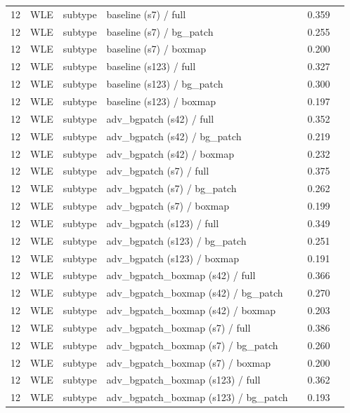 \begin{longtable}{cL{1.1cm}L{1.5cm}L{5.6cm}ccc}
12 & WLE & subtype & baseline (s7) / full & \nl{} & 0.359 & \nl{} \\
12 & WLE & subtype & baseline (s7) / bg\_patch & \nl{} & 0.255 & \nl{} \\
12 & WLE & subtype & baseline (s7) / boxmap & \nl{} & 0.200 & \nl{} \\
12 & WLE & subtype & baseline (s123) / full & \nl{} & 0.327 & \nl{} \\
12 & WLE & subtype & baseline (s123) / bg\_patch & \nl{} & 0.300 & \nl{} \\
12 & WLE & subtype & baseline (s123) / boxmap & \nl{} & 0.197 & \nl{} \\
12 & WLE & subtype & adv\_bgpatch (s42) / full & \nl{} & 0.352 & \nl{} \\
12 & WLE & subtype & adv\_bgpatch (s42) / bg\_patch & \nl{} & 0.219 & \nl{} \\
12 & WLE & subtype & adv\_bgpatch (s42) / boxmap & \nl{} & 0.232 & \nl{} \\
12 & WLE & subtype & adv\_bgpatch (s7) / full & \nl{} & 0.375 & \nl{} \\
12 & WLE & subtype & adv\_bgpatch (s7) / bg\_patch & \nl{} & 0.262 & \nl{} \\
12 & WLE & subtype & adv\_bgpatch (s7) / boxmap & \nl{} & 0.199 & \nl{} \\
12 & WLE & subtype & adv\_bgpatch (s123) / full & \nl{} & 0.349 & \nl{} \\
12 & WLE & subtype & adv\_bgpatch (s123) / bg\_patch & \nl{} & 0.251 & \nl{} \\
12 & WLE & subtype & adv\_bgpatch (s123) / boxmap & \nl{} & 0.191 & \nl{} \\
12 & WLE & subtype & adv\_bgpatch\_boxmap (s42) / full & \nl{} & 0.366 & \nl{} \\
12 & WLE & subtype & adv\_bgpatch\_boxmap (s42) / bg\_patch & \nl{} & 0.270 & \nl{} \\
12 & WLE & subtype & adv\_bgpatch\_boxmap (s42) / boxmap & \nl{} & 0.203 & \nl{} \\
12 & WLE & subtype & adv\_bgpatch\_boxmap (s7) / full & \nl{} & 0.386 & \nl{} \\
12 & WLE & subtype & adv\_bgpatch\_boxmap (s7) / bg\_patch & \nl{} & 0.260 & \nl{} \\
12 & WLE & subtype & adv\_bgpatch\_boxmap (s7) / boxmap & \nl{} & 0.200 & \nl{} \\
12 & WLE & subtype & adv\_bgpatch\_boxmap (s123) / full & \nl{} & 0.362 & \nl{} \\
12 & WLE & subtype & adv\_bgpatch\_boxmap (s123) / bg\_patch & \nl{} & 0.193 & \nl{} \\

\end{longtable}
